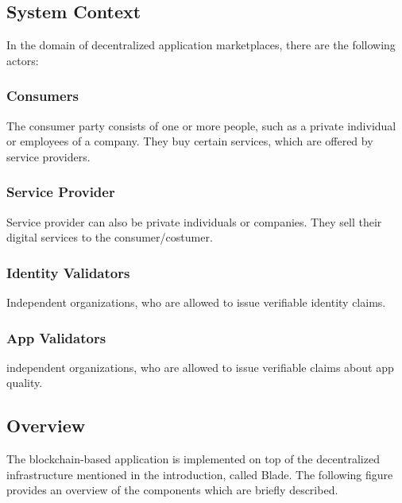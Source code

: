 \subsection{System Context}

In the domain of decentralized application marketplaces, there are the following actors: 

\subsubsection{Consumers}
The consumer party consists of one or more people, such as a private individual or employees of a company. They buy certain services, which are offered by service providers. 

\subsubsection{Service Provider}
Service provider can also be private individuals or companies. They sell their digital services to the consumer/costumer. 

\subsubsection{Identity Validators}
Independent organizations, who are allowed to issue verifiable identity claims. 

\subsubsection{App Validators}
independent organizations, who are allowed to issue verifiable claims about app quality. 

\subsection{Overview}
The blockchain-based application is implemented on top of the decentralized infrastructure mentioned in the introduction, called Blade. The following figure provides an overview of the components which are briefly described. 

